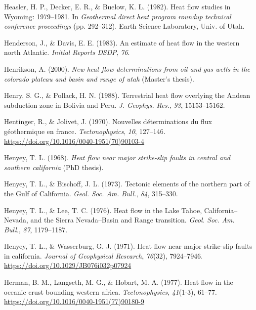 \begin{CSLReferences}{1}{1}
\leavevmode{}%
Heasler, H. P., Decker, E. R., \& Buelow, K. L. (1982). Heat flow studies in {Wyoming}: 1979--1981. In \emph{Geothermal direct heat program roundup technical conference proceedings} (pp. 292--312). Earth Science Laboratory, Univ. of Utah.

\leavevmode{}%
Henderson, J., \& Davis, E. E. (1983). An estimate of heat flow in the western north {Atlantic}. \emph{Initial Reports DSDP}, \emph{76}.

\leavevmode{}%
Henrikson, A. (2000). \emph{New heat flow determinations from oil and gas wells in the colorado plateau and basin and range of utah} (Master's thesis).

\leavevmode{}%
Henry, S. G., \& Pollack, H. N. (1988). Terrestrial heat flow overlying the {Andean} subduction zone in {Bolivia and Peru}. \emph{J. Geophys. Res.}, \emph{93}, 15153--15162.

\leavevmode{}%
Hentinger, R., \& Jolivet, J. (1970). Nouvelles déterminations du flux géothermique en france. \emph{Tectonophysics}, \emph{10}, 127--146. \url{https://doi.org/10.1016/0040-1951(70)90103-4}

\leavevmode{}%
Henyey, T. L. (1968). \emph{Heat flow near major strike-slip faults in central and southern california} (PhD thesis).

\leavevmode{}%
Henyey, T. L., \& Bischoff, J. L. (1973). Tectonic elements of the northern part of the {Gulf of California}. \emph{Geol. Soc. Am. Bull.}, \emph{84}, 315--330.

\leavevmode{}%
Henyey, T. L., \& Lee, T. C. (1976). Heat flow in the {Lake Tahoe, California--Nevada}, and the {Sierra Nevada--Basin and Range} transition. \emph{Geol. Soc. Am. Bull.}, \emph{87}, 1179--1187.

\leavevmode{}%
Henyey, T. L., \& Wasserburg, G. J. (1971). Heat flow near major strike-slip faults in california. \emph{Journal of Geophysical Research}, \emph{76}(32), 7924--7946. \url{https://doi.org/10.1029/JB076i032p07924}

\leavevmode{}%
Herman, B. M., Langseth, M. G., \& Hobart, M. A. (1977). Heat flow in the oceanic crust bounding western africa. \emph{Tectonophysics}, \emph{41}(1-3), 61--77. \url{https://doi.org/10.1016/0040-1951(77)90180-9}


\end{CSLReferences}
